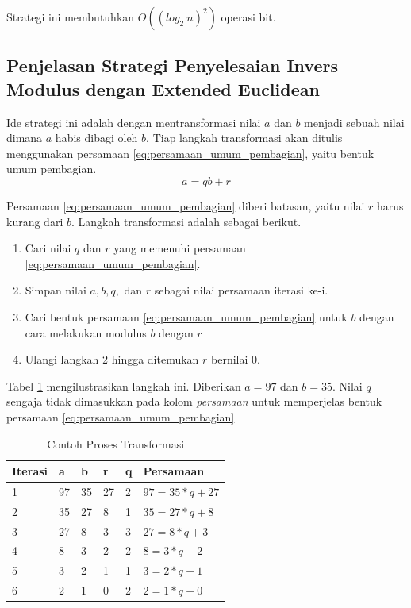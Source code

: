 Strategi ini membutuhkan $ O((log_2\ n)^2) $ operasi bit. \cite{hac_math}

\subsection{Penjelasan Strategi Penyelesaian Invers Modulus dengan Extended Euclidean}

Ide strategi ini adalah dengan mentransformasi nilai $ a $ dan $ b $ menjadi sebuah nilai dimana $ a $ habis dibagi oleh $ b $. Tiap langkah transformasi akan ditulis menggunakan persamaan \eqref{eq:persamaan_umum_pembagian}, yaitu bentuk umum pembagian.
\begin{equation*}
a=qb+r
\end{equation*}

Persamaan \eqref{eq:persamaan_umum_pembagian} diberi batasan, yaitu nilai $ r $ harus kurang dari $ b $. Langkah transformasi adalah sebagai berikut.
\begin{enumerate}
\item Cari nilai $ q $ dan $ r $ yang memenuhi persamaan \eqref{eq:persamaan_umum_pembagian}.
\item Simpan nilai $ a, b, q, $ dan $ r $ sebagai nilai persamaan iterasi ke-i.
\item Cari bentuk persamaan \eqref{eq:persamaan_umum_pembagian} untuk $ b $ dengan cara melakukan modulus $ b $ dengan $ r $
\item Ulangi langkah 2 hingga ditemukan $ r $ bernilai 0.
\end{enumerate}

Tabel \ref{tab:transformasi_ext_euclid} mengilustrasikan langkah ini. Diberikan $ a = 97 $ dan $ b = 35 $. Nilai $ q $ sengaja tidak dimasukkan pada kolom \textit{persamaan} untuk memperjelas bentuk persamaan \eqref{eq:persamaan_umum_pembagian}
\begin{table}[h!]
\Centering
\caption{Contoh Proses Transformasi}
\label{tab:transformasi_ext_euclid}
\begin{tabular}{ |l|l|l|l|l|l| }
	\hline
	Iterasi	& a		& b		& r		& q		& Persamaan \\
	\hline
	1		& 97	& 35	& 27	& 2		& $ 97 = 35 * q + 27 $ \\
	2		& 35	& 27	& 8		& 1		& $ 35 = 27 * q + 8 $ \\
	3		& 27	& 8		& 3		& 3		& $ 27 = 8 * q + 3 $ \\
	4		& 8		& 3		& 2		& 2		& $ 8 = 3 * q + 2 $ \\
	5		& 3		& 2		& 1		& 1		& $ 3 = 2 * q + 1 $ \\
	6		& 2		& 1		& 0		& 2		& $ 2 = 1 * q + 0 $ \\
	\hline
\end{tabular}
\end{table}


